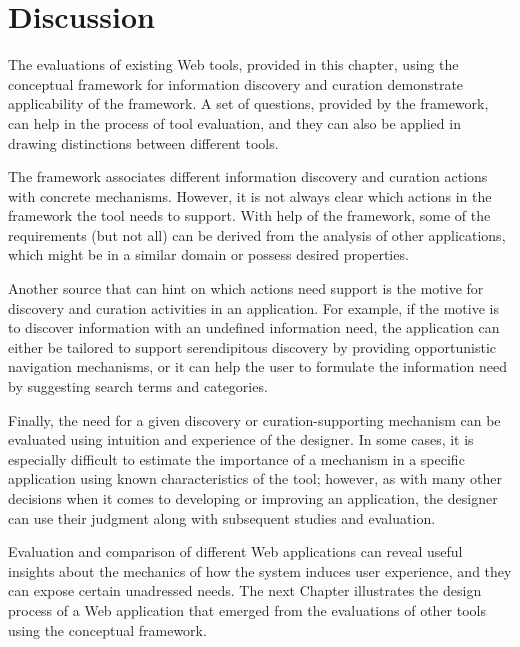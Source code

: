 {\section{Discussion}
The evaluations of existing Web tools, provided in this chapter, using the conceptual framework for information discovery and curation demonstrate applicability of the framework. A set of questions, provided by the framework, can help in the process of tool evaluation, and they can also be applied in drawing distinctions between different tools. 

The framework associates different information discovery and curation actions with concrete mechanisms. However, it is not always clear which actions in the framework the tool needs to support. With help of the framework, some of the requirements (but not all) can be derived from the analysis of other applications, which might be in a similar domain or possess desired properties. 

Another source that can hint on which actions need support is the motive for discovery and curation activities in an application. For example, if the motive is to discover information with an undefined information need, the application  can either be tailored to support serendipitous discovery by providing opportunistic navigation mechanisms, or it can help the user to formulate the information need by suggesting search terms and categories.

Finally, the need for a given discovery or curation-supporting mechanism can be evaluated using intuition and experience of the designer. In some cases, it is especially difficult to estimate the importance of a mechanism in a specific application using known characteristics of the tool; however, as with many other decisions when it comes to developing or improving an application, the designer can use their judgment along with subsequent studies and evaluation. 

Evaluation and comparison of different Web applications can reveal useful insights about the mechanics of how the system induces user experience, and they can expose certain unadressed needs. The next Chapter illustrates the design process of a Web application that emerged from the evaluations of other tools using the conceptual framework. 

} %